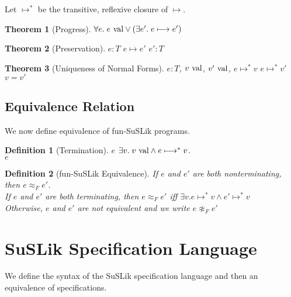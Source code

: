 \documentclass[10pt]{article}
\newtheorem{theorem}{Theorem}
\newtheorem{definition}{Definition}
\newcommand{\reduces}{\ensuremath{\longmapsto}}
\newcommand{\reducestr}{\ensuremath{\longmapsto^{*}}}
\newcommand{\val}{\textnormal{ val}}
\begin{document}
\noindent
Let $\reducestr$ be the transitive, reflexive closure of $\reduces$.

\begin{theorem}[Progress]
  $\forall e.\; e \val \lor (\exists e'.\; e \reduces e')$
\end{theorem}

\begin{theorem}[Preservation]
   $e : T$  $e \reduces e'$  $e' : T$
\end{theorem}

\begin{theorem}[Uniqueness of Normal Forms]
   $e : T$, $v \val$, $v' \val$, $e \reducestr v$  $e \reducestr v'$  $v = v'$
\end{theorem}

\subsection{Equivalence Relation}
\label{sec:FSEquiv}
We now define equivalence of fun-SuSLik programs.

\begin{definition}[Termination]
  $e$  $\exists v.\; v \val \land e \reducestr v$.\\
  $e$ 
\end{definition}

\begin{definition}[fun-SuSLik Equivalence]
  If $e$ and $e'$ are both nonterminating, then $e \approx_F e'$.\\
  If $e$ and $e'$ are both terminating, then $e \approx_F e'$ iff $\exists v. e \reducestr v \land e' \reducestr v$\\
  Otherwise, $e$ and $e'$ are not equivalent and we write $e \not\approx_F e'$
\end{definition}

\section{SuSLik Specification Language}
\label{sec:SuSLikDef}

We define the syntax of the SuSLik specification language and then an equivalence of specifications.
\end{document}
